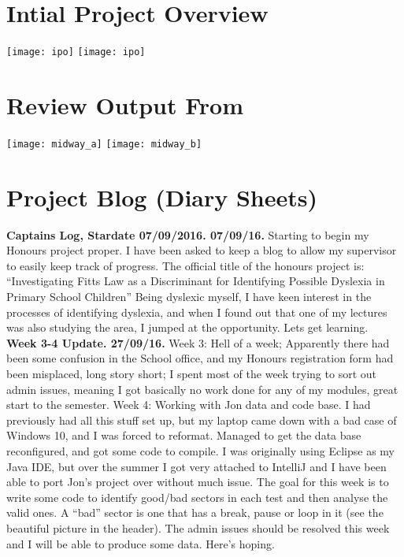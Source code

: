 \newpage
\begin{appendices}
	\section{Intial Project Overview}
		\texttt{[image: ipo]}		
		\texttt{[image: ipo]}
		\newpage
		
	\section{Review Output From}
		\texttt{[image: midway\_a]}
		\texttt{[image: midway\_b]}
		\newpage
		
	\section{Project Blog (Diary Sheets)}
		\textbf{Captains Log, Stardate 07/09/2016. 07/09/16.}
		Starting to begin my Honours project proper. I have been asked to keep a blog to allow my supervisor to easily keep track of progress.
		The official title of the honours project is:
		“Investigating Fitts Law as a Discriminant for Identifying Possible Dyslexia in Primary School Children”
		Being dyslexic myself, I have keen interest in the processes of identifying dyslexia, and when I found out that one of my lectures was also studying the area, I jumped at the opportunity.
		Lets get learning.\\
		
		\textbf{Week 3-4 Update. 27/09/16.}
		Week 3:
		Hell of a week; Apparently there had been some confusion in the School office, and my Honours registration form had been misplaced, long story short; I spent most of the week trying to sort out admin issues, meaning I got basically no work done for any of my modules, great start to the semester.
		Week 4:
		Working with Jon data and code base. I had previously had all this stuff set up, but my laptop came down with a bad case of Windows 10, and I was forced to reformat. Managed to get the data base reconfigured, and got some code to compile.
		I was originally using Eclipse as my Java IDE, but over the summer I got very attached to IntelliJ and I have been able to port Jon’s project over without much issue.
		The goal for this week is to write some code to identify good/bad sectors in each test and then analyse the valid ones.
		A “bad” sector is one that has a break, pause or loop in it (see the beautiful picture in the header).
		The admin issues should be resolved this week and I will be able to produce some data.
		Here’s hoping.\\
		

\end{appendices}
